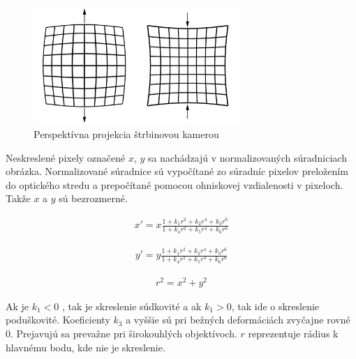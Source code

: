 \begin{figure}[h]
	\centering
	\includegraphics[width=0.7\textwidth]{figures/radial_distortion.jpg} 
	\caption{Perspektívna projekcia štrbinovou kamerou}
	\label{fig:radial_distortion}
\end{figure}

Neskreslené pixely označené $x$, $y$ sa nachádzajú v normalizovaných súradniciach obrázka. Normalizované súradnice sú vypočítané zo súradníc pixelov preložením do optického stredu a prepočítané pomocou ohniskovej vzdialenosti v pixeloch. Takže $x$ a $y$ sú bezrozmerné.

\begin{equation}
\label{eq::radial_dist::a}
\begin{aligned}
x'= x \frac{1 + k_{1}r^{2} + k_{2}r^{4} + k_{3}r^{6}}{1 + k_{4}r^{2} + k_{5}r^{4} + k_{6}r^{6}}
\end{aligned}
\end{equation}

\begin{equation}
\label{eq::radial_dist::b}
\begin{aligned}
y'= y \frac{1 + k_{1}r^{2} + k_{2}r^{4} + k_{3}r^{6}}{1 + k_{4}r^{2} + k_{5}r^{4} + k_{6}r^{6}}
\end{aligned}
\end{equation}

\begin{equation}
\label{eq::radial_dist::c}
\begin{aligned}
r^2=x^2+y^2
\end{aligned}
\end{equation}

Ak je $k_1<0$ , tak je skreslenie súdkovité a ak $k_1> 0$, tak ide o skreslenie poduškovité. Koeficienty $k_3$ a vyššie sú pri bežných deformáciách zvyčajne rovné 0. Prejavujú sa prevažne pri širokouhlých objektívoch. $r$ reprezentuje rádius k hlavnému bodu, kde nie je skreslenie.  

